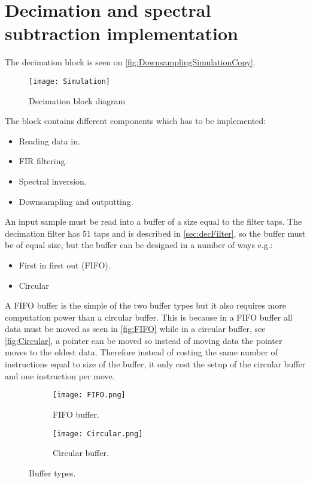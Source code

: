 \section{Decimation and spectral subtraction implementation}
The decimation block is seen on \autoref{fig:DownsamplingSimulationCopy}.
\begin{figure}[H]
    \centering
	\texttt{[image: Simulation]}
    \caption{Decimation block diagram}
    \label{fig:DownsamplingSimulationCopy}
\end{figure}
The block contains different components which has to be implemented:
\begin{itemize}
\item Reading data in.
\item FIR filtering.
\item Spectral inversion.
\item Downsampling and outputting. 
\end{itemize}
An input sample must be read into a buffer of a size equal to the filter taps. The decimation filter has 51 taps and is described in \autoref{sec:decFilter}, so the buffer must be of equal size, but the buffer can be designed in a number of ways e.g.:
\begin{itemize}
\item First in first out (FIFO).
\item Circular
\end{itemize} 
A FIFO buffer is the simple of the two buffer types but it also requires more computation power than a circular buffer. This is because in a FIFO buffer all data must be moved as seen in \autoref{fig:FIFO} while in a circular buffer, see \autoref{fig:Circular}, a pointer can be moved so instead of moving data the pointer moves to the oldest data. Therefore instead of costing the same number of instructions equal to size of the buffer, it only cost the setup of the circular buffer and one instruction per move.   
\begin{figure}[H]
\centering
\begin{subfigure}[t]{0.49\textwidth}
    \centering
	\texttt{[image: FIFO.png]}
	\label{fig:FIFO}
	\caption{FIFO buffer.}
\end{subfigure}
\begin{subfigure}[t]{0.49\textwidth}
    \centering
	\texttt{[image: Circular.png]}
	\label{fig:Circular}
	\caption{Circular buffer.}
\end{subfigure}
\caption{Buffer types.}
\label{fig:bufTypes}
\end{figure}
